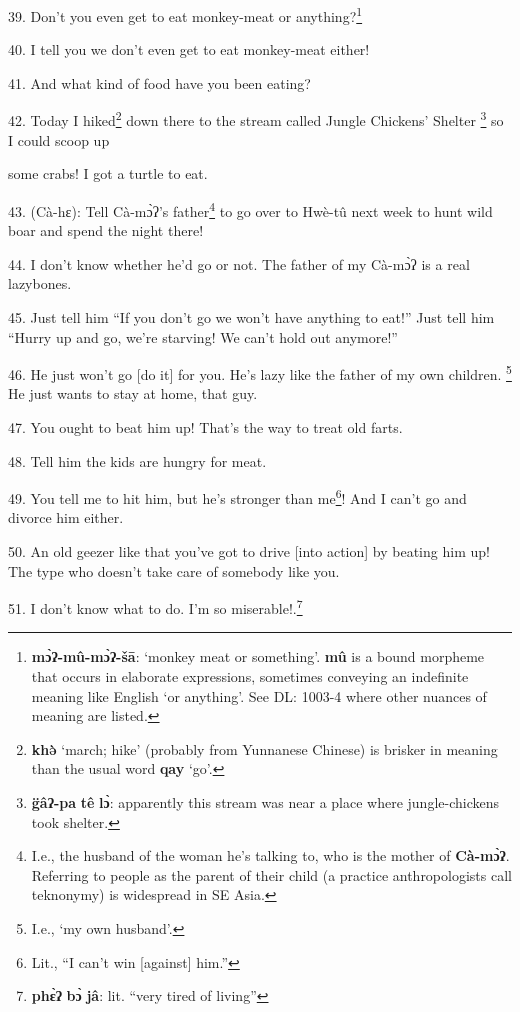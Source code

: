 39. Don't you even get to eat monkey-meat or anything?\footnote{\textbf{mɔ̀ʔ-mû-mɔ̀ʔ-šā}: `monkey meat or something'. \textbf{mû} is a bound morpheme that occurs in elaborate expressions, sometimes conveying an indefinite meaning like English `or anything'. See DL: 1003-4 where other nuances of meaning are listed.}

40. I tell you we don't even get to eat monkey-meat either!

41. And what kind of food have you been eating?

42. Today I hiked\footnote{\textbf{khə̀} `march; hike' (probably from Yunnanese Chinese) is brisker in meaning than the usual word \textbf{qay} `go'.} down there to the stream called Jungle Chickens' Shelter
\footnote{\textbf{g̈âʔ-pa} \textbf{tê} \textbf{lɔ̀}: apparently this stream was near a place where jungle-chickens took shelter.} so I could scoop up

some crabs! I got a turtle to eat.


43. (Cà-hɛ): Tell Cà-mɔ̀ʔ's father\footnote{I.e., the husband of the woman he's talking to, who is the mother of \textbf{Cà-mɔ̀ʔ}. Referring to people as the parent of their child (a practice anthropologists call teknonymy) is widespread in SE Asia.} to go over to Hwè-tû next week
to hunt wild boar and spend the night there!

44. I don't know whether he'd go or not. The father of my Cà-mɔ̀ʔ is a real
lazybones.

45. Just tell him ``If you don't go we won't have anything to eat!'' Just tell
him ``Hurry up and go, we're starving! We can't hold out anymore!''

46. He just won't go [do it] for you. He's lazy like the father of my own children.
\footnote{I.e., `my own husband'.} He just wants to stay at home, that guy.

47. You ought to beat him up! That's the way to treat old farts.

48. Tell him the kids are hungry for meat.

49. You tell me to hit him, but he's stronger than me\footnote{Lit., ``I can't win [against] him.''}! And I can't go and
divorce him either.

50. An old geezer like that you've got to drive [into action] by beating him up!
The type who doesn't take care of somebody like you.

51. I don't know what to do. I'm so miserable!.\footnote{\textbf{phɛ̀ʔ} \textbf{bɔ̀} \textbf{jâ}: lit. ``very tired of living''}

